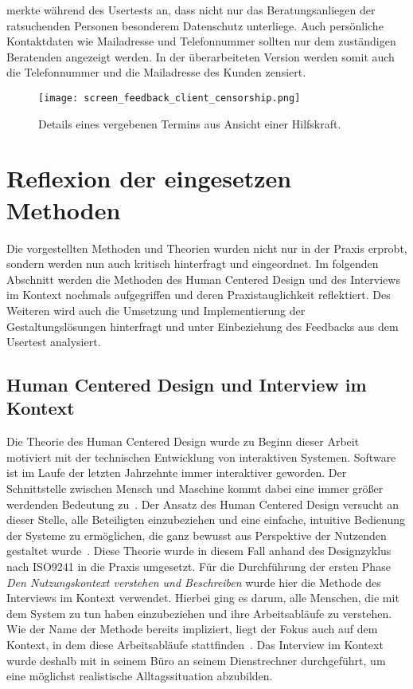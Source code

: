 \ipName merkte während des Usertests an, dass nicht nur das Beratungsanliegen der ratsuchenden Personen besonderem Datenschutz unterliege. Auch persönliche Kontaktdaten wie Mailadresse und Telefonnummer sollten nur dem zuständigen Beratenden angezeigt werden. In der überarbeiteten Version werden somit auch die Telefonnummer und die Mailadresse des Kunden zensiert.

\begin{figure}[H]
    \caption{Details eines vergebenen Termins aus Ansicht einer Hilfskraft.}
    \centering
    \texttt{[image: screen\_feedback\_client\_censorship.png]}
\end{figure}

\section{Reflexion der eingesetzen Methoden}
\label{subsection:reflection}

Die vorgestellten Methoden und Theorien wurden nicht nur in der Praxis erprobt, sondern
werden nun auch kritisch hinterfragt und eingeordnet. Im folgenden Abschnitt werden
die Methoden des Human Centered Design und des Interviews im Kontext nochmals
aufgegriffen und deren Praxistauglichkeit reflektiert. Des Weiteren wird auch
die Umsetzung und Implementierung der Gestaltungslösungen hinterfragt und
unter Einbeziehung des Feedbacks aus dem Usertest analysiert.

\subsection*{Human Centered Design und Interview im Kontext}
Die Theorie des Human Centered Design wurde zu Beginn dieser Arbeit motiviert
mit der technischen Entwicklung von interaktiven Systemen. Software ist im
Laufe der letzten Jahrzehnte immer interaktiver geworden. Der Schnittstelle
zwischen Mensch und Maschine kommt dabei eine immer größer werdenden Bedeutung
zu~\cite{hci}. Der Ansatz des Human Centered Design versucht an dieser Stelle,
alle Beteiligten einzubeziehen und eine einfache, intuitive Bedienung der
Systeme zu ermöglichen, die ganz bewusst aus Perspektive der Nutzenden
gestaltet wurde~\cite{sequenceDiagrams}. Diese Theorie wurde in diesem Fall
anhand des Designzyklus nach ISO9241 in die Praxis umgesetzt. Für die
Durchführung der ersten Phase \textit{Den Nutzungskontext verstehen und
    Beschreiben} wurde hier die Methode des Interviews im Kontext verwendet.
Hierbei ging es darum, alle Menschen, die mit dem System zu tun haben
einzubeziehen und ihre Arbeitsabläufe zu verstehen. Wie der Name der Methode
bereits impliziert, liegt der Fokus auch auf dem Kontext, in dem diese
Arbeitsabläufe stattfinden~\cite{hciHandbook}. Das Interview im Kontext wurde
deshalb mit \ipName in seinem Büro an seinem Dienstrechner durchgeführt, um eine
möglichst realistische Alltagssituation abzubilden.

